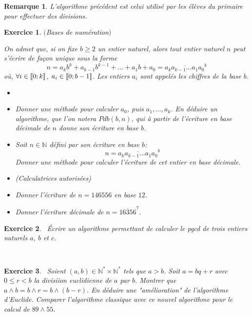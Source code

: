 \documentclass[11pt,a4paper]{article}
\newtheorem{ex}{Exercice}
\newtheorem*{remarque}{Remarque}
\newcommand{\N}{\mathbb{N}}
\begin{document}
\begin{remarque}
 L'algorithme précédent est celui utilisé par les élèves du primaire pour effectuer des divisions.%
\end{remarque}


\begin{ex}\label{exBases de numération}$($Bases de numération$)$

On admet que, si on fixe $b\geqslant 2$ un entier naturel, alors tout entier naturel $n$ peut s'écrire de façon unique sous la forme
$$ n=a_k b^k +a_{k-1}b^{k-1}+ \ldots + a_1 b +a_0= \overline{a_k a_{k-1}\ldots a_1 a_0}^b  $$
où, $ \forall i \in \llbracket 0; k \rrbracket $, $a_i \in \llbracket 0; b-1 \rrbracket$. Les entiers $a_i$ sont appelés les chiffres de la base $b$.
\begin{itemize}
\item[\textbf{Algorithmes}] 
\item[$1.$] Donner une méthode pour calculer $a_0$, puis $a_1, \ldots, a_k$.  En déduire un algorithme, que l'on notera $Pdb(b,n)$, qui à partir de l'écriture en base décimale de $n$ donne son écriture en base $b$. 
\item[$2.$] Soit $n \in \mathbb{N}$ défini par son écriture en base $b$:
$$ n=\overline{a_k a_{k-1}\ldots a_1 a_0}^b  $$
Donner une méthode pour calculer l'écriture de cet entier en base décimale. 
\item[\textbf{Applications}](Calculatrices autorisées)
\item[$3.$] Donner l'écriture de $n=146556$ en base $12$.
\item[$4.$] Donner l'écriture décimale de $n=\overline{16356}^7$.
\end{itemize}

\end{ex}





\begin{ex}\
Écrire un algorithme permettant de calculer le pgcd de trois entiers naturels $a$, $b$ et $c$.
\end{ex}



\

\begin{ex}\
Soient $(a,b)\in \N^*\times \N^*$ tels que $a>b$. Soit  $a=bq+r$ avec $0 \leqslant r <b$ la divisiion euclidienne de $a$ par $b$. Montrer que $a\wedge b=b\wedge r=b\wedge (b-r)$. En déduire une "amélioration" de l'algorithme d'Euclide. Comparer l'algorithme classique avec ce nouvel algorithme pour le calcul de $89\wedge 55$.
\end{ex}
\end{document}
